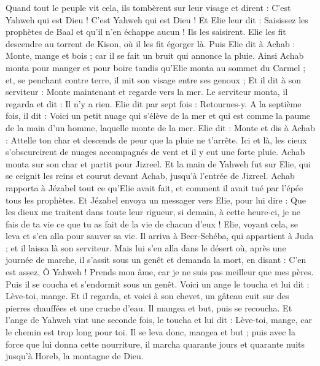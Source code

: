 \begin{multicols}{2}
Quand tout le peuple vit cela, ils tombèrent sur leur visage et dirent : C'est Yahweh qui est Dieu ! C'est Yahweh qui est Dieu !
Et Elie leur dit : Saisissez les prophètes de Baal et qu'il n'en échappe aucun ! Ils les saisirent. Elie les fit descendre au torrent de Kison, où il les fit égorger là.
Puis Elie dit à Achab : Monte, mange et bois ; car il se fait un bruit qui annonce la pluie.
Ainsi Achab monta pour manger et pour boire tandis qu’Elie monta au sommet du Carmel ; et, se penchant contre terre, il mit son visage entre ses genoux ;
Et il dit à son serviteur : Monte maintenant et regarde vers la mer. Le serviteur monta, il regarda et dit : Il n'y a rien. Elie dit par sept fois : Retournes-y.
A la septième fois, il dit : Voici un petit nuage qui s’élève de la mer et qui est comme la paume de la main d'un homme, laquelle monte de la mer. Elie dit : Monte et dis à Achab : Attelle ton char et descends de peur que la pluie ne t’arrête.
Ici et là, les cieux s'obscurcirent de nuages accompagnés de vent et il y eut une forte pluie. Achab monta sur son char et partit pour Jizreel.
Et la main de Yahweh fut sur Elie, qui se ceignit les reins et courut devant Achab, jusqu'à l'entrée de Jizreel.
\VerseOne{}Achab rapporta à Jézabel tout ce qu'Elie avait fait, et comment il avait tué par l'épée tous les prophètes.
Et Jézabel envoya un messager vers Elie, pour lui dire : Que les dieux me traitent dans toute leur rigueur, si demain, à cette heure-ci, je ne fais de ta vie ce que tu as fait de la vie de chacun d'eux !
Elie, voyant cela, se leva et s'en alla pour sauver sa vie. Il arriva à Beer-Schéba, qui appartient à Juda ; et il laissa là son serviteur.
Mais lui s'en alla dans le désert où, après une journée de marche, il s'assit sous un genêt et demanda la mort, en disant : C'en est assez, Ô Yahweh ! Prends mon âme, car je ne suis pas meilleur que mes pères.
Puis il se coucha et s'endormit sous un genêt. Voici un ange le toucha et lui dit : Lève-toi, mange.
Et il regarda, et voici à son chevet, un gâteau cuit sur des pierres chauffées et une cruche d'eau. Il mangea et but, puis se recoucha.
Et l'ange de Yahweh vint une seconde fois, le toucha et lui dit : Lève-toi, mange, car le chemin est trop long pour toi.
Il se leva donc, mangea et but ; puis avec la force que lui donna cette nourriture, il marcha quarante jours et quarante nuits jusqu'à Horeb, la montagne de Dieu.

\end{multicols}
